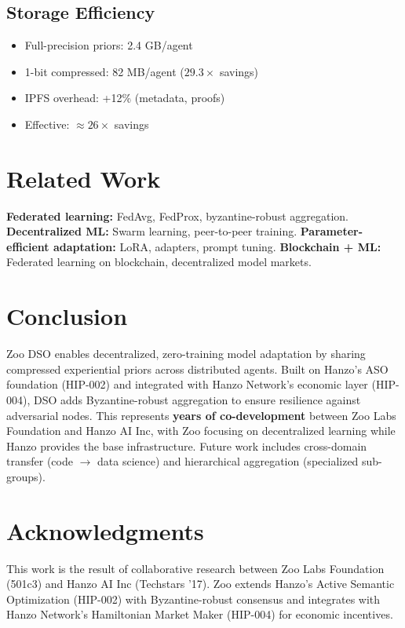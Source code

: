 \documentclass[11pt]{article}
\begin{document}
\subsection{Storage Efficiency}
\begin{itemize}[leftmargin=1.1em]
  \item Full-precision priors: 2.4 GB/agent
  \item 1-bit compressed: 82 MB/agent (\(29.3\times\) savings)
  \item IPFS overhead: +12\% (metadata, proofs)
  \item Effective: \(\approx 26\times\) savings
\end{itemize}

\section{Related Work}
\textbf{Federated learning:} FedAvg, FedProx, byzantine-robust aggregation. \textbf{Decentralized ML:} Swarm learning, peer-to-peer training. \textbf{Parameter-efficient adaptation:} LoRA, adapters, prompt tuning. \textbf{Blockchain + ML:} Federated learning on blockchain, decentralized model markets.

\section{Conclusion}
Zoo DSO enables decentralized, zero-training model adaptation by sharing compressed experiential priors across distributed agents. Built on Hanzo's ASO foundation (HIP-002) and integrated with Hanzo Network's economic layer (HIP-004), DSO adds Byzantine-robust aggregation to ensure resilience against adversarial nodes. This represents \textbf{years of co-development} between Zoo Labs Foundation and Hanzo AI Inc, with Zoo focusing on decentralized learning while Hanzo provides the base infrastructure. Future work includes cross-domain transfer (code \(\to\) data science) and hierarchical aggregation (specialized sub-groups).

\section*{Acknowledgments}
This work is the result of collaborative research between Zoo Labs Foundation (501c3) and Hanzo AI Inc (Techstars '17). Zoo extends Hanzo's Active Semantic Optimization (HIP-002) with Byzantine-robust consensus and integrates with Hanzo Network's Hamiltonian Market Maker (HIP-004) for economic incentives.
\end{document}
